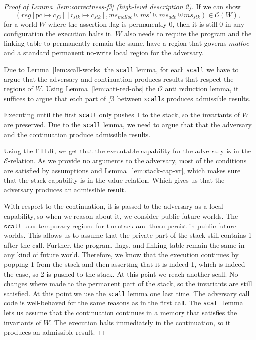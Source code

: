 \documentclass[a4paper]{article}
\newcommand{\update}[2]{[#1 \mapsto #2]}
\newcommand\lau[1]{{\color{purple} \sf \footnotesize {LS: #1}}\\}
\renewcommand\lau[1]{}
\newcommand{\var}[1]{\mathit{#1}}
\newcommand{\hs}{\var{ms}}
\newcommand{\ms}{\hs}
\newcommand{\pcreg}{\mathrm{pc}}
\newcommand{\reg}{\var{reg}}
\newcommand{\adv}{\var{adv}}
\newcommand{\stk}{\var{stk}}
\newcommand{\codelabel}[1]{\mathit{#1}}
\newcommand{\malloc}{\codelabel{malloc}}
\newcommand{\asmType}{\plaindom{AsmType}}
\newcommand{\plaindom}[1]{\mathrm{#1}}
\newcommand{\intr}[2]{\mathcal{#1}}
\newcommand{\exprintr}[1]{\intr{E}{#1}}
\newcommand{\stder}{\exprintr{\asmType}}
\newcommand{\observations}{\mathcal{O}}
\begin{document}
\begin{proof}[Proof of Lemma~\ref{lem:correctness-f3} (high-level description 2)]
\lau{Another go at a proof sketch. More true to the proof below.}
If we can show
\begin{equation}
  (\reg\update{\pcreg}{c_{f3}}\update{r_\stk}{c_\stk},\ms_{\malloc} \uplus \ms' \uplus \ms_{\adv} \uplus \ms_\stk) \in \observations(W),
\end{equation}
for a world $W$ where the assertion flag is permanently 0, then it is still 0 in any configuration the execution halts in. $W$ also needs to require the program and the linking table to permanently remain the same, have a region that governs $\malloc$ and a standard permanent no-write local region for the adversary.

Due to Lemma~\ref{lem:scall-works} the \texttt{scall} lemma, for each \texttt{scall} we have to argue that the adversary and continuation produces results that respect the regions of $W$. Using Lemma~\ref{lem:anti-red-obs} the $\observations$ anti reduction lemma, it suffices to argue that each part of $f3$ between \texttt{scall}s produces admissible results.

Executing until the first \texttt{scall} only pushes 1 to the stack, so the invariants of $W$ are preserved. Due to the \texttt{scall} lemma, we need to argue that that the adversary and the continuation produce admissible results.

Using the FTLR, we get that the executable capability for the adversary is in the $\stder$-relation. As we provide no arguments to the adversary, most of the conditions are satisfied by assumptions and Lemma~\ref{lem:stack-cap-vr}, which makes sure that the stack capability is in the value relation. Which gives us that the adversary produces an admissible result.

With respect to the continuation, it is passed to the adversary as a local capability, so when we reason about it, we consider public future worlds. The \texttt{scall} uses temporary regions for the stack and these persist in public future worlds. This allows us to assume that the private part of the stack still contains 1 after the call. Further, the program, flags, and linking table remain the same in any kind of future world. Therefore, we know that the execution continues by popping 1 from the stack and then asserting that it is indeed 1, which is indeed the case, so 2 is pushed to the stack. At this point we reach another scall. No changes where made to the permanent part of the stack, so the invariants are still satisfied. At this point we use the \texttt{scall} lemma one last time. The adversary call code is well-behaved for the same reasons as in the first call. The \texttt{scall} lemma lets us assume that the continuation continues in a memory that satisfies the invariants of $W$. The execution halts immediately in the continuation, so it produces an admissible result.
\end{proof}
\end{document}
